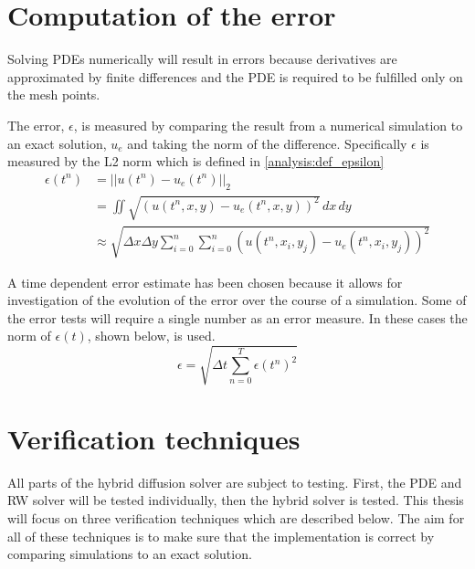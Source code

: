 \section{Computation of the error}

Solving PDEs numerically will result in errors because derivatives are approximated by finite differences and the PDE is required to be fulfilled only on the mesh points. 
% 
% 

The error, $\epsilon$, is measured by comparing the result from a numerical simulation to an exact solution, $u_e$ and taking the norm of the difference. 
Specifically $\epsilon$ is measured by the L2 norm which is defined in \eqref{analysis:def_epsilon}
\begin{align}
 \epsilon(t^n) &= ||u(t^n)-u_e(t^n)||_2 \nonumber \\
 &= \iint\sqrt{\left(u(t^n,x,y)-u_e(t^n,x,y)\right)^2}\,dx\,dy \nonumber \\
 &\approx \sqrt{\Delta x\Delta y\sum\limits_{i=0}^n\sum\limits_{i=0}^n \left(u(t^n,x_i,y_j)-u_e(t^n,x_i,y_j)\right)^2}\label{analysis:def_epsilon}
 \end{align}
 
\noindent A time dependent error estimate has been chosen because it allows for investigation of the evolution of the error over the course of a simulation.
Some of the error tests will require a single number as an error measure. 
In these cases the norm of $\epsilon(t)$, shown below, is used.
\begin{equation}\label{analysis:convergence_test_error}
 \epsilon = \sqrt{\Delta t\sum\limits_{n=0}^T\epsilon(t^n)^2}
\end{equation}

\section{Verification techniques}
All parts of the hybrid diffusion solver are subject to testing. First, the PDE and RW solver will be tested individually, then the hybrid solver is tested. 
This thesis will focus on three verification techniques which are described below. 
The aim for all of these techniques is to make sure that the implementation is correct by comparing simulations to an exact solution. \\

